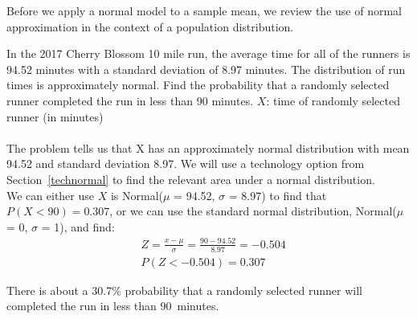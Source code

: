 Before we apply a normal model to a sample mean, we review the use of normal approximation in the context of a population distribution.

\begin{examplewrap}
\begin{nexample}{
In the 2017 Cherry Blossom 10 mile run, the average time for all of the runners is 94.52 minutes with a standard deviation of 8.97 minutes. The distribution of run times is approximately normal. Find the probability that a randomly selected runner completed the run in less than 90 minutes.}
$X$: time of randomly selected runner (in minutes)\\ \\
The problem tells us that X has an approximately normal distribution with mean 94.52 and standard deviation 8.97.  We will use a technology option from Section~\ref{technormal} to find the relevant area under a normal distribution.  \\

We can either use $X$ is Normal($\mu$ = 94.52, $\sigma$ = 8.97) to find that $P(X < 90) = 0.307$,
or we can use the standard normal distribution, Normal($\mu$ = 0, $\sigma$ = 1), and find:
\begin{align*}
&Z = \frac{x - \mu}{\sigma}=\frac{90-94.52}{8.97}=-0.504 \\
&P(Z < -0.504) = 0.307
\end{align*}
\begin{center}
  \hspace{5mm}
\end{center}

There is about a 30.7\% probability that a randomly selected runner will completed the run in less than 90~minutes.
\label{cherry1}
\end{nexample}
\end{examplewrap}

